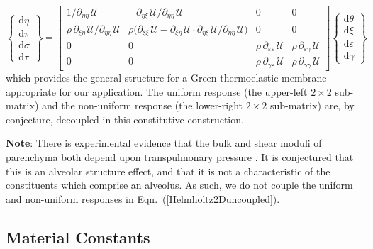 \begin{equation}
\left\{ \begin{matrix}
\mathrm{d} \eta \\ \mathrm{d} \pi \\
\mathrm{d} \sigma \\ \mathrm{d} \tau
\end{matrix} \right\} = \begin{bmatrix}
1 / \partial_{\eta\eta\,} \mathcal{U} & 
-\partial_{\eta\xi\,} \mathcal{U} / \partial_{\eta\eta\,} \mathcal{U} & 
0 & 0 \\ 
\rho \, \partial_{\xi\eta\,} \mathcal{U} / \partial_{\eta\eta\,} \mathcal{U} & 
\rho \bigl( \partial_{\xi\xi\,} \mathcal{U} - \partial_{\xi\eta\,} \mathcal{U} \!\cdot\! \partial_{\eta\xi\,} \mathcal{U} / \partial_{\eta\eta\,} \mathcal{U} \bigr) & 0 & 0 \\
0 & 0 & \rho \, \partial_{\varepsilon\varepsilon\,} \mathcal{U} & 
\rho \, \partial_{\varepsilon\gamma\,} \mathcal{U} \\
0 & 0 & \rho \, \partial_{\gamma\varepsilon\,} \mathcal{U} & 
\rho \, \partial_{\gamma\gamma\,} \mathcal{U} 
\end{bmatrix} 
\left\{ \begin{matrix}
\mathrm{d}\theta \\ \mathrm{d} \xi \\
\mathrm{d} \varepsilon \\ \mathrm{d} \gamma
\end{matrix} \right\}  
\label{Helmholtz2Duncoupled}
\end{equation}
which provides the general structure for a Green thermo\-elastic membrane appropriate for our application.  The uniform response (the upper-left $2 \times 2$ sub-matrix) and the non-uniform response (the lower-right $2 \times 2$ sub-matrix) are, by conjecture, decoupled in this constitutive construction.

\medskip\noindent
\textbf{Note}: There is experimental evidence that the bulk and shear moduli of parenchyma both depend upon transpulmonary pressure \cite{LaiFook79,Jahedetal90}.  It is conjectured that this is an alveolar structure effect, and that it is not a characteristic of the constituents which comprise an alveolus.  As such, we do not couple the uniform and non-uniform responses in Eqn.~(\ref{Helmholtz2Duncoupled}).

\subsection{Material Constants}
\label{secMaterialConstants}


